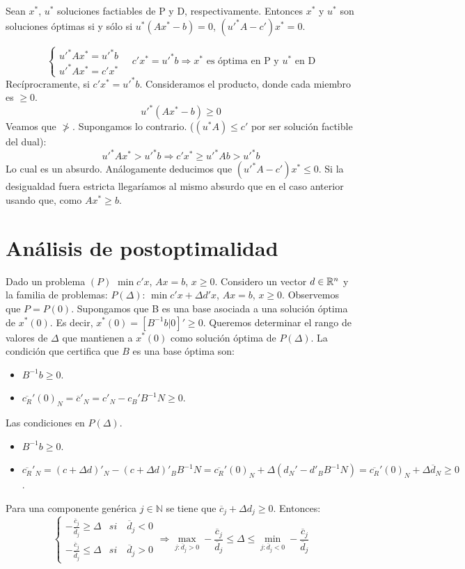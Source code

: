 \documentclass[PM.tex]{subfiles}
\begin{document}
\begin{theorem} Sean $x^*$, $u^*$ soluciones factiables de P y D, respectivamente. Entonces $x^*$ y $u^*$ son soluciones óptimas si y sólo si $u^*(Ax^*-b)=0$, $(u'^{*} A-c')x^*=0$.
\end{theorem}
\begin{dem}
\[
\begin{cases}
u'^* A x^* = u'^*b \\
u'^*A x^* = c'x^* 
\end{cases}
\quad c'x^* = u'^*b \Rightarrow \text{$x^*$ es óptima en P y $u^*$ en D}
\]
Recíprocramente, si $c'x^*=u'^*b$. Consideramos el producto, donde cada miembro es $\geq 0$.
\[
u'^*(Ax^*-b)\geq 0
\]
Veamos que $\not >$. Supongamos lo contrario. ($(u^*A) \leq c'$ por ser solución factible del dual):
\[
u'^*Ax^* > u'^* b \Rightarrow c'x^* \geq u'^*Ab>u'^*b
\]
Lo cual es un absurdo. Análogamente deducimos que $(u'^*A-c')x^* \leq 0$. Si la desigualdad fuera estricta llegaríamos al mismo absurdo que en el caso anterior usando que, como $Ax^* \geq b$.
\end{dem}
\section{Análisis de postoptimalidad}
Dado un problema $(P)$ $\min c'x$, $Ax=b$, $x\geq 0$. Considero un vector $d\in\mathbb{R}^n$ y la familia de problemas: $P(\Delta)$: $\min c'x + \Delta d'x$, $Ax=b$, $x\geq 0$. Observemos que $P=P(0)$. Supongamos que B es una base asociada a una solución óptima de $x^*(0)$. Es decir, $x^*(0)=[B^{-1}b | 0]' \geq 0$. Queremos determinar el rango de valores de $\Delta$ que mantienen a $x^*(0)$ como solución óptima de $P(\Delta)$. La condición que certifica que $B$ es una base óptima son:
\begin{itemize}
\item $B^{-1}b \geq 0$.
\item $\overline{c_R}'(0)_N  = \overline{c}'_N = c'_N - c_B'B^{-1}N \geq 0$. 
\end{itemize}
Las condiciones en $P(\Delta)$. 
\begin{itemize}
\item $B^{-1}b \geq 0$.
\item $\overline{c_R}'_N = (c +\Delta d)'_N- (c+\Delta d)'_B B^{-1}N = \overline{c_R}'(0)_N  + \Delta (d_N'-d'_BB^{-1}N) =  \overline{c_R}'(0)_N + \Delta \overline{d}_N\geq 0$. 
\end{itemize}
Para una componente genérica $j\in \mathbb{N}$ se tiene que $\overline{c}_j+\Delta d_j\geq 0$. Entonces:
\[
\begin{cases}
-\frac{\overline{c}_j}{\overline{d}_j} \geq \Delta & si \quad \overline{d}_j <0\\
-\frac{\overline{c}_j}{\overline{d}_j} \leq \Delta & si \quad \overline{d}_j >0
\end{cases}
\Rightarrow \max_{j:\overline{d}_j >0}-\frac{\overline{c}_j}{\overline{d}_j} \leq \Delta \leq \min_{j:\overline{d}_j <0}-\frac{\overline{c}_j}{\overline{d}_j}
\]
\end{document}
